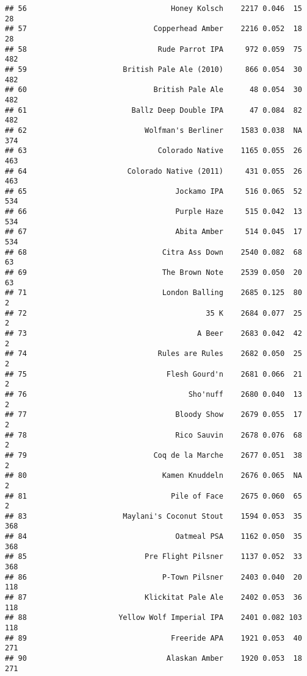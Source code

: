 \documentclass[
]{article}
\begin{document}
\begin{verbatim}
## 56                                 Honey Kolsch    2217 0.046  15         28
## 57                             Copperhead Amber    2216 0.052  18         28
## 58                              Rude Parrot IPA     972 0.059  75        482
## 59                      British Pale Ale (2010)     866 0.054  30        482
## 60                             British Pale Ale      48 0.054  30        482
## 61                        Ballz Deep Double IPA      47 0.084  82        482
## 62                           Wolfman's Berliner    1583 0.038  NA        374
## 63                              Colorado Native    1165 0.055  26        463
## 64                       Colorado Native (2011)     431 0.055  26        463
## 65                                  Jockamo IPA     516 0.065  52        534
## 66                                  Purple Haze     515 0.042  13        534
## 67                                  Abita Amber     514 0.045  17        534
## 68                               Citra Ass Down    2540 0.082  68         63
## 69                               The Brown Note    2539 0.050  20         63
## 71                               London Balling    2685 0.125  80          2
## 72                                         35 K    2684 0.077  25          2
## 73                                       A Beer    2683 0.042  42          2
## 74                              Rules are Rules    2682 0.050  25          2
## 75                                Flesh Gourd'n    2681 0.066  21          2
## 76                                     Sho'nuff    2680 0.040  13          2
## 77                                  Bloody Show    2679 0.055  17          2
## 78                                  Rico Sauvin    2678 0.076  68          2
## 79                             Coq de la Marche    2677 0.051  38          2
## 80                               Kamen Knuddeln    2676 0.065  NA          2
## 81                                 Pile of Face    2675 0.060  65          2
## 83                      Maylani's Coconut Stout    1594 0.053  35        368
## 84                                  Oatmeal PSA    1162 0.050  35        368
## 85                           Pre Flight Pilsner    1137 0.052  33        368
## 86                               P-Town Pilsner    2403 0.040  20        118
## 87                           Klickitat Pale Ale    2402 0.053  36        118
## 88                     Yellow Wolf Imperial IPA    2401 0.082 103        118
## 89                                 Freeride APA    1921 0.053  40        271
## 90                                Alaskan Amber    1920 0.053  18        271

\end{verbatim}
\end{document}
